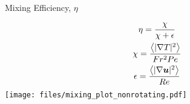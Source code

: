 \documentclass{beamer}
\begin{document}
\begin{frame}{Mixing Efficiency, $\eta$}
    \centering

        \begin{gather*}
            \eta = \frac{\chi}{\chi + \epsilon}\\
            \chi = \frac{\left<|\grad T|^2\right>}{Fr^2Pe}\\
            \epsilon = \frac{\left<|\grad \uvec|^2\right>}{Re}
        \end{gather*}
    \emp
        \texttt{[image: files/mixing\_plot\_nonrotating.pdf]}
    \emp
\end{frame}

\begin{comment}
\begin{frame}{Discussion}

    \begin{itemize}
        \item What might be ideal parameters to directly compare new simulations
        to previous?
        \item Are the weighted $w_{rms}$ definitions still valid in a
        multi-directionally forced flow? 
    \end{itemize}

\end{frame}
\end{comment}

\begin{comment}
\begin{frame}{Mixing and Vertical Vorticity }

    \bmp{0.49}
        \centering
        \texttt{[image: files/vortz\_pB400\_vr.png]}
    \emp
    \bmp{0.49}
        \centering
        \texttt{[image: files/chi\_pB400\_vr.png]}
    \emp
    
\end{frame}

\begin{frame}{Mixing and Vertical Vorticity}
    \centering
    \bmp{0.49}
        \centering
        \texttt{[image: files/vortz\_B180\_vr2.png]}
    \emp
    \bmp{0.49}
        \centering
        \texttt{[image: files/chi\_B180\_vr2.png]}
    \emp
\end{frame}
\end{comment}
\end{document}
